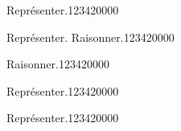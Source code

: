 \begin{pageParcourst}

\begin{ExoCt}{Représenter.}{1234}{2}{0}{0}{0}{0}


\end{ExoCt}

\begin{ExoCt}{Représenter. Raisonner.}{1234}{2}{0}{0}{0}{0}
 
 


\end{ExoCt}


\begin{ExoCt}{Raisonner.}{1234}{2}{0}{0}{0}{0}
 
\end{ExoCt}

\begin{ExoCt}{Représenter.}{1234}{2}{0}{0}{0}{0}

 

\end{ExoCt}

\begin{ExoCt}{Représenter.}{1234}{2}{0}{0}{0}{0}

 

\end{ExoCt} 
 
\end{pageParcourst}



\begin{pageBrouillon} 
 



\end{pageBrouillon}



